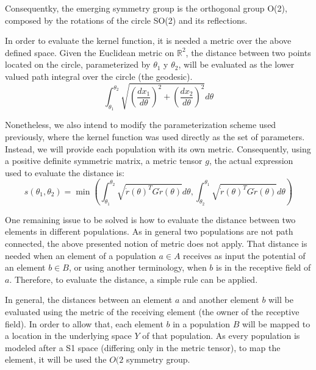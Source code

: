 Consequentky, the emerging symmetry group is the orthogonal group
O(2), composed by the rotations of the circle SO(2) and its
reflections.

In order to evaluate the kernel function, it is needed a metric over
the above defined space. Given the Euclidean metric on $\mathbb{R}^2$,
the distance between two points located on the circle, parameterized
by $\theta_1$ y $\theta_2$, will be evaluated as the lower valued path
integral over the circle (the geodesic).
\begin{equation}
  \int_{\theta_1}^{\theta_2}\sqrt{\left(\frac{dx_1}{d\theta}\right)^2
    + \left(\frac{dx_2}{d\theta}\right)^2}d\theta
\end{equation}

Nonetheless, we also intend to modify the parameterization scheme used
previously, where the kernel function was used directly as the set of
parameters. Instead, we will provide each population with its own
metric. Consequently, using a positive definite symmetric matrix, a
metric tensor $g$, the actual expression used to evaluate the distance
is:
\begin{equation}
  s(\theta_1,\theta_2)=\min\left(\int_{\theta_1}^{\theta_2}\sqrt{\dot{r}(\theta)^TG\dot{r}(\theta)}d\theta,\int_{\theta_2}^{\theta_1}\sqrt{\dot{r}(\theta)^TG\dot{r}(\theta)}d\theta\right)
\end{equation}

One remaining issue to be solved is how to evaluate the distance
between two elements in different populations. As in general two
populations are not path connected, the above presented notion of
metric does not apply. That distance is needed when an element of a
population $a \in A$ receives as input the potential of an element $b
\in B$, or using another terminology, when $b$ is in the receptive
field of $a$. Therefore, to evaluate the distance, a simple rule can
be applied.

In general, the distances between an element $a$ and another element
$b$ will be evaluated using the metric of the receiving element (the
owner of the receptive field). In order to allow that, each element
$b$ in a population $B$ will be mapped to a location in the underlying
space $Y$ of that population. As every population is modeled after a
S1 space (differing only in the metric tensor), to map the element, it
will be used the $O(2$ symmetry group.

